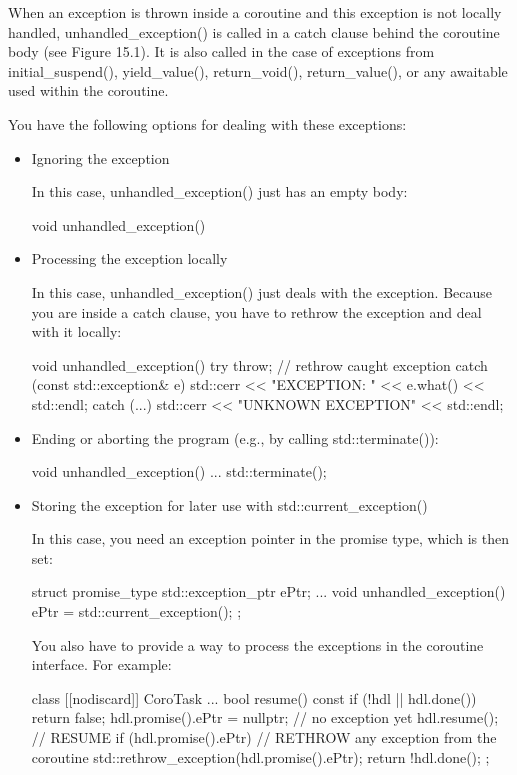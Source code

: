 When an exception is thrown inside a coroutine and this exception is not locally handled, unhandled_exception() is called in a catch clause behind the coroutine body (see Figure 15.1). It is also called in the case of exceptions from initial_suspend(), yield_value(), return_void(), return_value(), or any awaitable used within the coroutine.

You have the following options for dealing with these exceptions:

\begin{itemize}
\item 
Ignoring the exception

In this case, unhandled\_exception() just has an empty body:

\begin{cpp}
void unhandled_exception() {
}
\end{cpp}

\item 
Processing the exception locally 

In this case, unhandled\_exception() just deals with the exception. Because you are inside a catch clause, you have to rethrow the exception and deal with it locally:

\begin{cpp}
void unhandled_exception() {
	try {
		throw; // rethrow caught exception
	}
	catch (const std::exception& e) {
		std::cerr << "EXCEPTION: " << e.what() << std::endl;
	}
	catch (...) {
		std::cerr << "UNKNOWN EXCEPTION" << std::endl;
	}
}
\end{cpp}

\item 
Ending or aborting the program (e.g., by calling std::terminate()):

\begin{cpp}
void unhandled_exception() {
	...
	std::terminate();
}
\end{cpp}

\item 
Storing the exception for later use with std::current\_exception() 

In this case, you need an exception pointer in the promise type, which is then set:

\begin{cpp}
struct promise_type {
	std::exception_ptr ePtr;
	...
	void unhandled_exception() {
		ePtr = std::current_exception();
	}
};
\end{cpp}

You also have to provide a way to process the exceptions in the coroutine interface. For example:

\begin{cpp}
class [[nodiscard]] CoroTask {
	...
	bool resume() const {
		if (!hdl || hdl.done()) {
			return false;
		}
		hdl.promise().ePtr = nullptr; // no exception yet
		hdl.resume(); // RESUME
		if (hdl.promise().ePtr) { // RETHROW any exception from the coroutine
			std::rethrow_exception(hdl.promise().ePtr);
		}
		return !hdl.done();
	}
};
\end{cpp}
\end{itemize}

